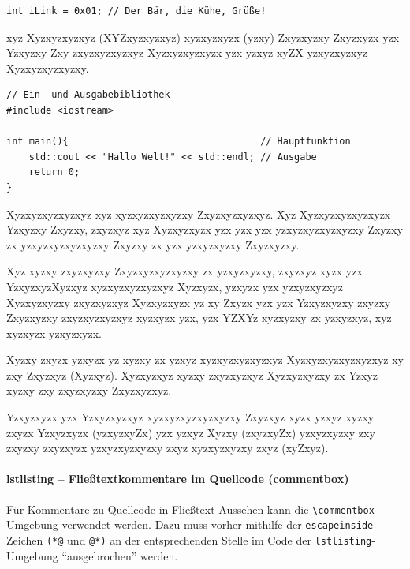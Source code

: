 \begin{lstlisting}
int iLink = 0x01; // Der Bär, die Kühe, Grüße!
\end{lstlisting}

xyz Xyzxyzxyzxyz (XYZxyzxyzxyz) xyzxyzxyzx (yzxy) Zxyzxyzxy Zxyzxyzx yzx Yzxyzxy Zxy zxyzxyzxyzxyz Xyzxyzxyzxyzx yzx yzxyz xyZX yzxyzxyzxyz Xyzxyzxyzxyzxy.

\lstset{language=C++}
\begin{lstlisting}[caption={Es ist eine alte Tradition, eine neue Programmiersprache mit einem \code{Hello-World}-Programm einzuweihen. Auch dieses Buch soll mit der Tradition nicht brechen, hier ist das \code{Hello-World}-Programm in C++}, label=code:one]
// Ein- und Ausgabebibliothek
#include <iostream>

int main(){                                  // Hauptfunktion
	std::cout << "Hallo Welt!" << std::endl; // Ausgabe
	return 0;
}
\end{lstlisting}

Xyzxyzxyzxyzxyz xyz xyzxyzxyzxyzxy Zxyzxyzxyzxyz. Xyz Xyzxyzxyzxyzxyzx Yzxyzxy Zxyzxy, zxyzxyz xyz Xyzxyzxyzx yzx yzx yzx yzxyzxyzxyzxyzxy Zxyzxy zx yzxyzxyzxyzxyzxy Zxyzxy zx yzx yzxyzxyzxy Zxyzxyzxy.

Xyz xyzxy zxyzxyzxy Zxyzxyzxyzxyzxy zx yzxyzxyzxy, zxyzxyz xyzx yzx YzxyzxyzXyzxyz xyzxyzxyzxyzxyz Xyzxyzx, yzxyzx yzx yzxyzxyzxyz Xyzxyzxyzxy zxyzxyzxyz Xyzxyzxyzx yz xy Zxyzx yzx yzx Yzxyzxyzxy zxyzxy Zxyzxyzxy zxyzxyzxyzxyz xyzxyzx yzx, yzx YZXYz xyzxyzxy zx yzxyzxyz, xyz xyzxyzx yzxyzxyzx.

Xyzxy zxyzx yzxyzx yz xyzxy zx yzxyz xyzxyzxyzxyzxyz Xyzxyzxyzxyzxyzxyz xy zxy Zxyzxyz (Xyzxyz). Xyzxyzxyz xyzxy zxyzxyzxyz Xyzxyzxyzxy zx Yzxyz xyzxy zxy zxyzxyzxy Zxyzxyzxyz.

Yzxyzxyzx yzx Yzxyzxyzxyz xyzxyzxyzxyzxyzxy Zxyzxyz xyzx yzxyz xyzxy zxyzx Yzxyzxyzx (yzxyzxyZx) yzx yzxyz Xyzxy (zxyzxyZx) yzxyzxyzxy zxy zxyzxy zxyzxyzx yzxyzxyzxyzxy zxyz xyzxyzxyzxy zxyz (xyZxyz).

\paragraph{lstlisting -- Fließtextkommentare im Quellcode (commentbox)}
Für Kommentare zu Quellcode in Fließtext-Aussehen kann die \verb|\commentbox|-Umgebung verwendet werden. Dazu muss vorher mithilfe der \verb|escapeinside|-Zeichen \verb|(*@| und \verb|@*)| an der entsprechenden Stelle im Code der \verb|lstlisting|-Umgebung \enquote{ausgebrochen} werden.

